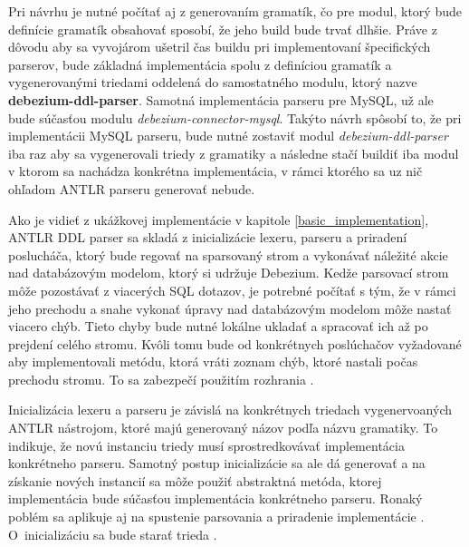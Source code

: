 Pri návrhu je nutné počítať aj z generovaním gramatík, čo pre modul, ktorý bude definície gramatík obsahovať sposobí, že jeho build bude trvať dlhšie. Práve z dôvodu aby sa vyvojárom ušetril čas buildu pri implementovaní špecifických parserov, bude základná implementácia spolu z definíciou gramatík a vygenerovanými triedami oddelená do samostatného modulu, ktorý nazve \textbf{debezium-ddl-parser}. Samotná implementácia parseru pre MySQL, už ale bude súčasťou modulu \textit{debezium-connector-mysql}. Takýto návrh spôsobí to, že pri implementácii MySQL parseru, bude nutné zostaviť modul \textit{debezium-ddl-parser} iba raz aby sa vygenerovali triedy z gramatiky a následne stačí buildiť iba modul v ktorom sa nachádza konkrétna implementácia, v rámci ktorého sa uz nič ohľadom ANTLR parseru generovať nebude.

Ako je vidieť z ukážkovej implementácie v kapitole \ref{basic_implementation}, ANTLR DDL parser sa skladá z inicializácie lexeru, parseru a priradení poslucháča, ktorý bude regovať na sparsovaný strom a vykonávať náležité akcie nad databázovým modelom, ktorý si udržuje Debezium. 
Kedže parsovací strom môže pozostávať z viacerých SQL dotazov, je potrebné počítať s tým, že v rámci jeho prechodu a snahe vykonať úpravy nad databázovým modelom môže nastať viacero chýb. Tieto chyby bude nutné lokálne ukladať a spracovať ich až po prejdení celého stromu. Kvôli tomu bude od konkrétnych poslúchačov vyžadované aby implementovali metódu, ktorá vráti zoznam chýb, ktoré nastali počas prechodu stromu. To sa zabezpečí použitím rozhrania . 

Inicializácia lexeru a parseru je závislá na konkrétnych triedach vygenervoaných ANTLR nástrojom, ktoré majú generovaný názov podľa názvu gramatiky. To indikuje, že novú instanciu triedy musí sprostredkovávať implementácia konkrétneho parseru. Samotný postup inicializácie sa ale dá generovať a na získanie nových instancií sa môže použiť abstraktná metóda, ktorej implementácia bude súčasťou implementácia konkrétneho parseru. Ronaký poblém sa aplikuje aj na spustenie parsovania a priradenie implementácie . \mbox{O inicializáciu} sa bude starať trieda .

